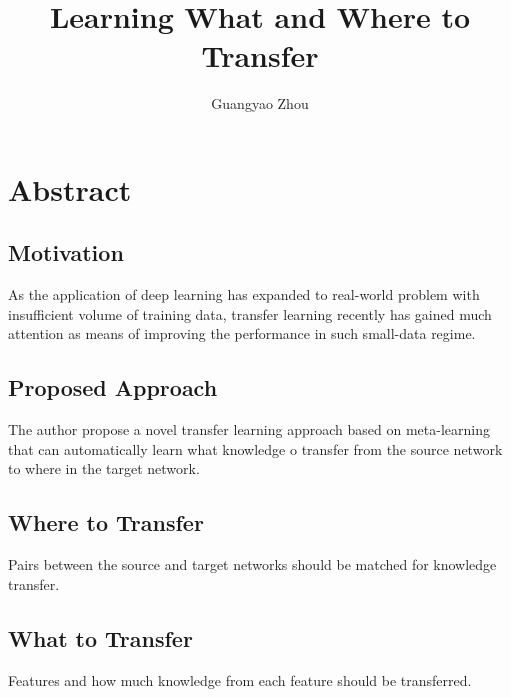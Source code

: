 \documentclass{article}
\author{Guangyao Zhou}
\title{Learning What and Where to Transfer}
\begin{document}
	\maketitle
	\section{Abstract}
	\subsection{Motivation}
	As the application of deep learning has expanded to real-world problem with insufficient volume of training data, transfer learning recently has gained much attention as means of improving the performance in such small-data regime.
	\subsection{Proposed Approach}
	The author propose a novel transfer learning approach based on meta-learning that can automatically learn what knowledge o transfer from the source network to where in the target network.
	\subsection{Where to Transfer}
	Pairs between the source and target networks should be matched for knowledge transfer.
	\subsection{What to Transfer}
	Features and how much knowledge from each feature should be transferred.
	
\end{document}
